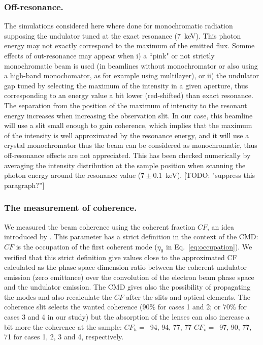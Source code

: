 \documentclass{iucr}              %
\newcommand{\todo}[1]{{\color{red}[TODO: "#1'']}}
\begin{document}
\subsubsection{Off-resonance.} The simulations considered here where done for monochromatic radiation supposing the undulator tuned at the exact resonance (\SI{7}{keV}). This photon energy may not exactly correspond to the maximum of the emitted flux. Somme effects of out-resonance may appear when i) a ``pink" or not strictly monochromatic beam is used (in beamlines without monochromator or also using a high-band monochomator, as for example using multilayer), or ii) the undulator gap tuned by selecting the maximum of the intensity in a given aperture, thus corresponding to an energy value a bit lower (red-shifted) than exact resonance. The separation from the position of the maximum of intensity to the resonant energy increases when increasing the observation slit. In our case, this beamline will use a slit small enough to gain coherence, which implies that the maximum of the intensity is well approximated by the resonance energy, and it will use a crystal monochromator thus the beam can be considered as monochromatic, thus off-resonance effects are not appreciated. This has been checked numerically by averaging the intensity distribution at the sample position when scanning the photon energy around the resonance value ($7\pm0.1$~keV).   \todo{suppress this paragraph?}


\subsubsection{The measurement of coherence.} We measured the beam coherence using the coherent fraction $CF$, an idea introduced by . This parameter has a strict definition in the context of the CMD: $CF$ is the occupation of the first coherent mode ($\eta_0$ in Eq.~\ref{eq:occupation}). We verified that this strict definition give values close to the approximated CF  calculated as the phase space dimension ratio between the coherent undulator emission (zero emittance) over the convolution of the electron beam phase space and the undulator emission. The CMD gives also the possibility of propagating the modes and also recalculate the $CF$ after the slits and optical elements. The coherence slit selects the wanted coherence (90\% for cases 1 and 2; or 70\% for cases 3 and 4 in our study) but the absorption of the lenses can also increase a bit more the coherence at the sample: $CF_h=$~94, 94, 77, 77 $CF_v=$~97, 90, 77, 71 for cases 1, 2, 3 and 4, respectively. 
\end{document}
